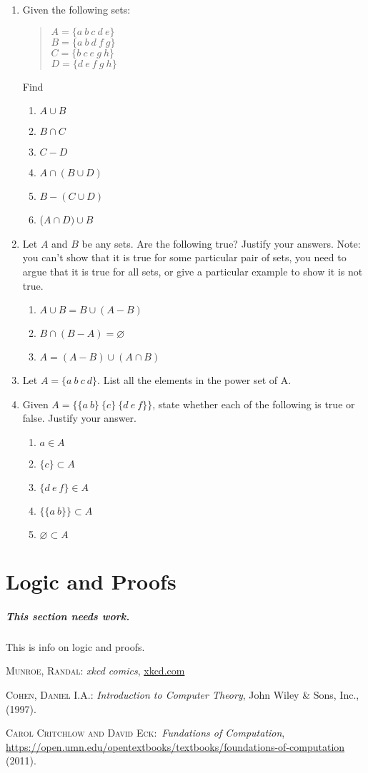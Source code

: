 \documentclass[letterpaper,12pt,openany,reqno]{book}%
\newcommand{\needswork}{\paragraph{This section needs work.}}
\begin{document}
\begin{enumerate}
\item Given the following sets:
\begin{quote}
$A = \{a \ b \ c \ d \ e\}$\\
$B = \{a \ b \ d \ f \ g\}$\\
$C = \{b \ c \ e \ g \ h\}$\\
$D = \{d \ e \ f \ g \ h\}$\\
\end{quote}
Find
\begin{enumerate}
\item $A \cup B$
\item $B \cap C$
\item $C - D$
\item $A \cap (B \cup D)$
\item $B - (C \cup D)$
\item ($A \cap D) \cup B$
\end{enumerate}

\item Let $A$ and $B$ be any sets. Are the following true? Justify your answers. Note: you can't show that it is true for some particular pair of sets, you need to argue that it is true for all sets, or give a particular example to show it is not true.
\begin{enumerate}
\item $A \cup B = B \cup (A - B)$
\item $B \cap (B - A) = \varnothing$
\item $A = (A - B) \cup (A \cap B)$
\end{enumerate}
\item Let $A = \{a \ b \ c \ d\}$. List all the elements in the power set of A.
\item Given $A = \{\{a \ b\} \ \{c\} \ \{d \ e \ f\}\}$, state whether each of the following is true or false. Justify your answer.
\begin{enumerate}
\item $a \in A$
\item $\{c\} \subset A$
\item $\{d \ e \ f\} \in A$
\item $\{\{a \ b\}\} \subset A$
\item $\varnothing \subset A$
\end{enumerate}
\end{enumerate}

\chapter{Logic and Proofs}
\needswork
This is info on logic and proofs.

\begin{thebibliography}{9}
 \textsc{Munroe, Randal}: \textit{xkcd comics}, \url{xkcd.com}

 \textsc{Cohen, Daniel I.A.}: \textit{Introduction to Computer Theory}, John Wiley \& Sons, Inc., (1997).

 \textsc{Carol Critchlow and David Eck}:\ \textit{Fundations of Computation}, \url{https://open.umn.edu/opentextbooks/textbooks/foundations-of-computation} (2011).
\end{thebibliography}
\end{document}
